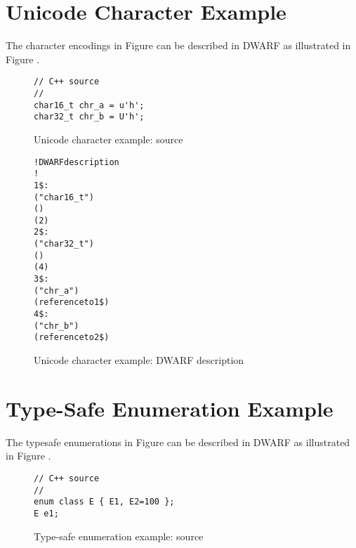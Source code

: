 \section{Unicode Character Example}
\label{app:unicodecharacterexample}
The  character encodings in
Figure 
can be described in DWARF as illustrated in 
Figure .

\begin{figure}[!h]
\begin{lstlisting}[numbers=none]
// C++ source
//
char16_t chr_a = u'h';
char32_t chr_b = U'h';
\end{lstlisting}
\caption{Unicode character example: source}
\label{fig:unicodecharacterexamplesource}
\end{figure}

\begin{figure}[h]
\begin{dwflisting}
\begin{alltt}

! DWARF description
!
1\$: \DWTAGbasetype
        \DWATname("char16\_t")
        \DWATencoding(\DWATEUTF)
        \DWATbytesize(2)
2\$: \DWTAGbasetype
        \DWATname("char32\_t")
        \DWATencoding(\DWATEUTF)
        \DWATbytesize(4)
3\$: \DWTAGvariable
        \DWATname("chr\_a")
        \DWATtype(reference to 1\$)
4\$: \DWTAGvariable
        \DWATname("chr\_b")
        \DWATtype(reference to 2\$)
\end{alltt}
\end{dwflisting}
\caption{Unicode character example: DWARF description}
\label{fig:unicodecharacterexampledwarfdescription}
\end{figure}


\section{Type-Safe Enumeration Example}
\label{app:typesafeenumerationexample}

The  type\dash safe enumerations in
Figure 
can be described in DWARF as illustrated in 
Figure .

\clearpage	%

\begin{figure}[H]
\begin{lstlisting}[numbers=none]
// C++ source
//
enum class E { E1, E2=100 };
E e1;
\end{lstlisting}
\caption{Type-safe enumeration example: source}
\label{fig:ctypesafeenumerationexamplesource}
\end{figure}

